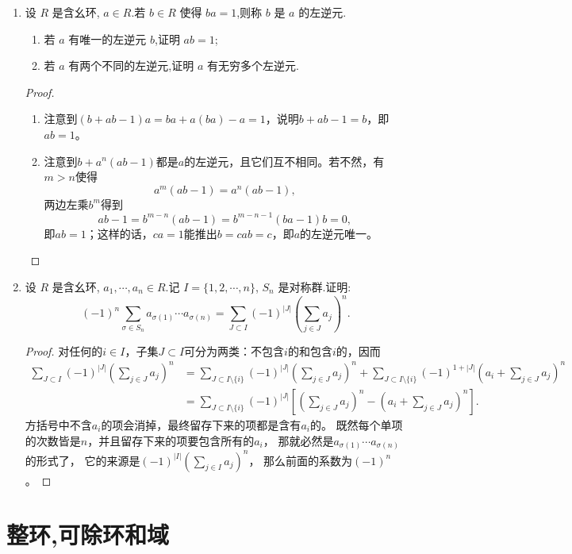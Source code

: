 \begin{enumerate}
\item 设 $ R $ 是含幺环, $ a \in R $.若 $ b \in R $ 使得 $ ba = 1 $,则称 $ b $ 是 $ a $ 的左逆元.
\begin{enumerate}[label=(\arabic*)]
    \item 若 $ a $ 有唯一的左逆元 $ b $,证明 $ ab = 1 $;
    \item 若 $ a $ 有两个不同的左逆元,证明 $ a $ 有无穷多个左逆元.
\end{enumerate}
\begin{proof}
    \begin{enumerate}[label=(\arabic*)]
    \item 注意到$(b+ab-1)a=ba+a(ba)-a=1$，说明$b+ab-1=b$，即$ab=1$。
    \item 注意到$b+a^n(ab-1)$都是$a$的左逆元，且它们互不相同。若不然，有$m>n$使得
    \[a^m(ab-1)=a^n(ab-1),\]
    两边左乘$b^m$得到
    \[ab-1=b^{m-n}(ab-1)=b^{m-n-1}(ba-1)b=0,\]
    即$ab=1$；这样的话，$ca=1$能推出$b=cab=c$，即$a$的左逆元唯一。\qedhere
    \end{enumerate}
\end{proof}

\item 设 $ R $ 是含幺环, $ a_1, \cdots, a_n \in R $.记 $ I = \{1, 2, \cdots, n\} $, $ S_n $ 是对称群.证明:
\[
(-1)^n \sum_{\sigma \in S_n} a_{\sigma(1)} \cdots a_{\sigma(n)} = \sum_{J \subset I} (-1)^{|J|} \left( \sum_{j \in J} a_j \right)^n.
\]
\begin{proof}
    对任何的$i \in I$，子集$J \subset I$可分为两类：不包含$i$的和包含$i$的，因而
    \begin{align*}
        \sum_{J \subset I}(-1)^{|J|}\left(\sum_{j \in J}a_j\right)^n
        &=\sum_{J \subset I\setminus\{i\}}(-1)^{|J|}\left(\sum_{j \in J}a_j\right)^n
        +\sum_{J \subset I\setminus\{i\}}(-1)^{1+|J|}\left(a_i+\sum_{j \in J}a_j\right)^n\\
        &=\sum_{J \subset I\setminus\{i\}}(-1)^{|J|}\left[\left(\sum_{j \in J}a_j\right)^n-\left(a_i+\sum_{j \in J}a_j\right)^n\right].
    \end{align*}
    方括号中不含$a_i$的项会消掉，最终留存下来的项都是含有$a_i$的。
    既然每个单项的次数皆是$n$，并且留存下来的项要包含所有的$a_i$，
    那就必然是$a_{\sigma(1)} \cdots a_{\sigma(n)}$的形式了，
    它的来源是$\displaystyle(-1)^{|I|}\left(\sum_{j \in I}a_j\right)^n$，
    那么前面的系数为$(-1)^n$。
\end{proof}
\end{enumerate}

\section{整环,可除环和域}

